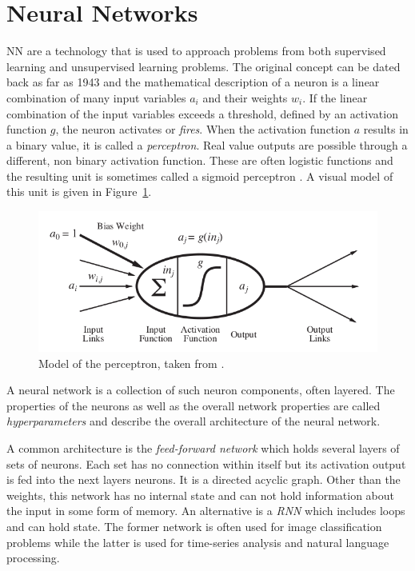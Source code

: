 \section{Neural Networks}%
\label{sec:neural_networks}



\acl {NN} are a technology that is used to approach problems from both supervised learning and unsupervised learning problems. The original
concept can be dated back as far as 1943 \cite[p.727]{russell2016artificial} and the mathematical description of a
neuron is a linear combination of many input variables $a_i$ and their weights $w_i$. If the linear combination of the
input variables exceeds a threshold, defined by an activation function $g$, the neuron activates or \emph{fires}. When
the activation function $a$ results in a binary value, it is called a \emph{perceptron}. Real value outputs are possible
through a different, non binary activation function. These are often logistic functions and the resulting unit is
sometimes called a sigmoid perceptron \cite[p.729]{russell2016artificial}. A visual model of this unit
is given in Figure~\ref{fig:perceptron}.

\begin{figure}[]
    \centering
    \includegraphics[width=0.8\linewidth]{img/perceptron.png}
    \caption{Model of the perceptron, taken from \cite[]{russell2016artificial}.}
    \label{fig:perceptron}
\end{figure}

A neural network  is a collection of such neuron components, often layered. The properties of the neurons as well
as the overall network properties are called \emph{hyperparameters} and describe the overall architecture of the neural network.

A common architecture is the \emph{feed-forward network} which holds several layers of sets of neurons. Each set has no
connection within itself but its activation output is fed into the next layers neurons. It is a directed
acyclic graph. Other than the weights, this network has no internal state and can not hold information about
the input in some form of memory. An alternative is a \emph{\acl {RNN} } which includes loops and can
hold state. The former network is often used for image classification problems while the latter is used for
time-series analysis and natural language processing.

